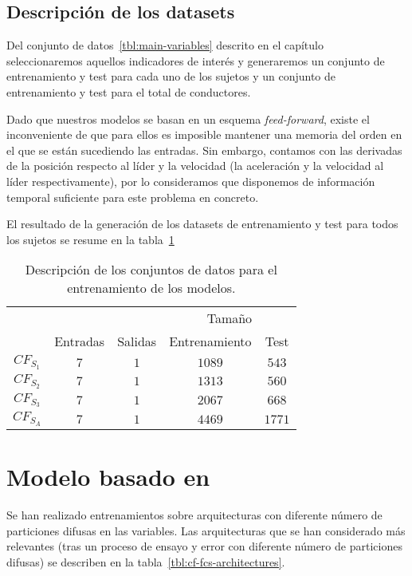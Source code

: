\subsection{Descripción de los datasets}

Del conjunto de datos~\ref{tbl:main-variables} descrito en el capítulo~ seleccionaremos aquellos indicadores de interés y generaremos un conjunto de entrenamiento y test para cada uno de los sujetos y un conjunto de entrenamiento y test para el total de conductores.

Dado que nuestros modelos se basan en un esquema \textit{feed-forward}, existe el inconveniente de que para ellos es imposible mantener una memoria del orden en el que se están sucediendo las entradas. Sin embargo, contamos con las derivadas de la posición respecto al líder y la velocidad (la aceleración y la velocidad al líder respectivamente), por lo consideramos que disponemos de información temporal suficiente para este problema en concreto.

El resultado de la generación de los datasets de entrenamiento y test para todos los sujetos se resume en la tabla~\ref{tbl:cf-datasets-description}

\begin{table}[t]
	\centering
	\caption[Descripción de los conjuntos de datos]{Descripción de los conjuntos de datos para el entrenamiento de los modelos.}
	\label{tbl:cf-datasets-description}
	\begin{tabular}{ccccc}
		\toprule
		& & & \multicolumn{2}{c}{Tamaño} \\
		& Entradas & Salidas & Entrenamiento & Test \\
		\midrule
		\rowcolor{black!20} $CF_{S_1}$ & $7$ & $1$ & $1089$ & $543$ \\
		$CF_{S_2}$ & $7$ & $1$ & $1313$ & $560$ \\
		\rowcolor{black!20} $CF_{S_3}$ & $7$ & $1$ & $2067$ & $668$ \\
		$CF_{S_A}$ & $7$ & $1$ & $4469$ & $1771$ \\
		\bottomrule
	\end{tabular}
\end{table}

\section{Modelo basado en }

Se han realizado entrenamientos sobre arquitecturas con diferente número de particiones difusas en las variables. Las arquitecturas que se han considerado más relevantes (tras un proceso de ensayo y error con diferente número de particiones difusas) se describen en la tabla~\ref{tbl:cf-fcs-architectures}. 

